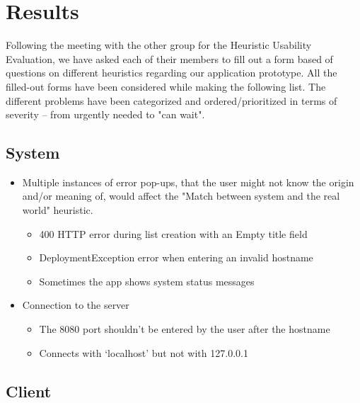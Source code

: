 \section{Results}

Following the meeting with the other group for the Heuristic Usability Evaluation, we have asked each of their members to fill out a form based of questions on different heuristics regarding our application prototype. All the filled-out forms have been considered while making the following list. The different problems have been categorized and ordered/prioritized in terms of severity – from urgently needed to "can wait".

\subsection{System}

\begin{itemize}
    \item Multiple instances of error pop-ups, that the user might not know the origin and/or meaning of, would affect the "Match between system and the real world" heuristic.
    \begin{itemize}
        \item 400 HTTP error during list creation with an Empty title field
        \item DeploymentException error when entering an invalid hostname
        \item Sometimes the app shows system status messages
    \end{itemize}
    \item Connection to the server
    \begin{itemize}
        \item The 8080 port shouldn’t be entered by the user after the hostname
        \item Connects with ‘localhost’ but not with 127.0.0.1
    \end{itemize}
\end{itemize}

\subsection{Client}

